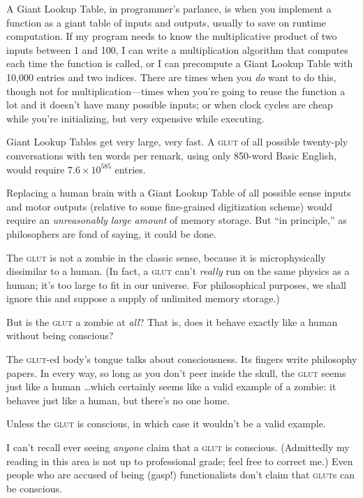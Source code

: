 {
 A Giant Lookup Table, in programmer's parlance, is
when you implement a function as a giant table of inputs and outputs,
usually to save on runtime computation. If my program needs to know the
multiplicative product of two inputs between 1 and 100, I can write a
multiplication algorithm that computes each time the function is
called, or I can precompute a Giant Lookup Table with 10,000 entries
and two indices. There are times when you \textit{do} want to do this,
though not for multiplication---times when you're going
to reuse the function a lot and it doesn't have many
possible inputs; or when clock cycles are cheap while
you're initializing, but very expensive while
executing.}

{
 Giant Lookup Tables get very large, very fast. A \textsc{glut} of all
possible twenty-ply conversations with ten words per remark, using only
850-word Basic English, would require $7.6 \times 10^{585}$ entries.}

{
 Replacing a human brain with a Giant Lookup Table of all possible
sense inputs and motor outputs (relative to some fine-grained
digitization scheme) would require an \textit{unreasonably large
amount} of memory storage. But ``in
principle,'' as philosophers are fond of saying, it
could be done.}

{
 The \textsc{glut} is not a zombie in the classic sense, because it is
microphysically dissimilar to a human. (In fact, a \textsc{glut}
can't \textit{really} run on the same physics as a
human; it's too large to fit in our universe. For
philosophical purposes, we shall ignore this and suppose a supply of
unlimited memory storage.)}

{
 But is the \textsc{glut} a zombie at \textit{all}? That is, does it behave
exactly like a human without being conscious?}

{
 The \textsc{glut}-ed body's tongue talks about
consciousness. Its fingers write philosophy papers. In every way, so
long as you don't peer inside the skull, the \textsc{glut} seems
just like a human \ldots which certainly seems like a valid example of a
zombie: it behaves just like a human, but there's no
one home.}

{
 Unless the \textsc{glut} is conscious, in which case it
wouldn't be a valid example.}

{
 I can't recall ever seeing \textit{anyone} claim
that a \textsc{glut} is conscious. (Admittedly my reading in this area is not up
to professional grade; feel free to correct me.) Even people who are
accused of being (gasp!) functionalists don't claim
that \textsc{glut}s can be conscious.}

